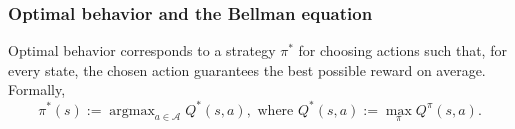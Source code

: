 \documentclass[10pt,letterpaper]{article}
\DeclareMathOperator{\argmax}{argmax}
\begin{document}


\subsubsection{Optimal behavior and the Bellman equation}

Optimal behavior corresponds to a strategy $\pi^*$ for choosing actions such that, for every state, the chosen action guarantees the best possible reward on average. Formally,
\begin{equation}
  \pi^*(s) := \argmax_{a \in \mathcal A}{Q}^*(s, a),\text{ where }Q^*(s, a) := \max_{\pi}Q^\pi(s,a).
  \label{eq:qlearning}
\end{equation}
\end{document}
